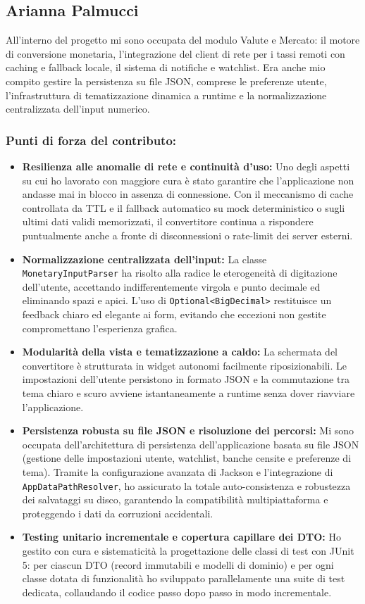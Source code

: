 \documentclass[11pt,a4paper,openright]{report}
\begin{document}
\clearpage
\subsection{Arianna Palmucci}
All'interno del progetto mi sono occupata del modulo Valute e Mercato: il motore di conversione monetaria, l'integrazione del client di rete per i tassi remoti con caching e fallback locale, il sistema di notifiche e watchlist. Era anche mio compito gestire la persistenza su file JSON, comprese le preferenze utente, l'infrastruttura di tematizzazione dinamica a runtime e la normalizzazione centralizzata dell'input numerico.

\subsubsection*{Punti di forza del contributo:}
\begin{itemize}
  \item \textbf{Resilienza alle anomalie di rete e continuità d'uso:} Uno degli aspetti su cui ho lavorato con maggiore cura è stato garantire che l'applicazione non andasse mai in blocco in assenza di connessione. Con il meccanismo di cache controllata da TTL e il fallback automatico su mock deterministico o sugli ultimi dati validi memorizzati, il convertitore continua a rispondere puntualmente anche a fronte di disconnessioni o rate-limit dei server esterni.
  \item \textbf{Normalizzazione centralizzata dell'input:} La classe \texttt{MonetaryInputParser} ha risolto alla radice le eterogeneità di digitazione dell'utente, accettando indifferentemente virgola e punto decimale ed eliminando spazi e apici. L'uso di \texttt{Optional<BigDecimal>} restituisce un feedback chiaro ed elegante ai form, evitando che eccezioni non gestite compromettano l'esperienza grafica.
  \item \textbf{Modularità della vista e tematizzazione a caldo:} La schermata del convertitore è strutturata in widget autonomi facilmente riposizionabili. Le impostazioni dell'utente persistono in formato JSON e la commutazione tra tema chiaro e scuro avviene istantaneamente a runtime senza dover riavviare l'applicazione.
  \item \textbf{Persistenza robusta su file JSON e risoluzione dei percorsi:} Mi sono occupata dell'architettura di persistenza dell'applicazione basata su file JSON (gestione delle impostazioni utente, watchlist, banche censite e preferenze di tema). Tramite la configurazione avanzata di Jackson e l'integrazione di \texttt{AppDataPathResolver}, ho assicurato la totale auto-consistenza e robustezza dei salvataggi su disco, garantendo la compatibilità multipiattaforma e proteggendo i dati da corruzioni accidentali.
  \item \textbf{Testing unitario incrementale e copertura capillare dei DTO:} Ho gestito con cura e sistematicità la progettazione delle classi di test con JUnit 5: per ciascun DTO (record immutabili e modelli di dominio) e per ogni classe dotata di funzionalità ho sviluppato parallelamente una suite di test dedicata, collaudando il codice passo dopo passo in modo incrementale.
\end{itemize}
\end{document}
